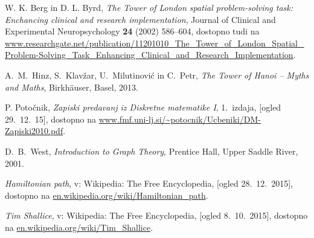 \documentclass[12pt,a4paper]{amsart}
\theoremstyle{definition} %
\theoremstyle{plain} %
\newcommand{\geslo}[2]{\noindent\textbf{#1}\hspace*{3mm}\hangindent=\parindent\hangafter=1 #2}
\begin{document}
%
%

\begin{thebibliography}{99}

W. K. Berg in D. L. Byrd, \emph{The Tower of London spatial problem-solving task: Enchancing clinical and research implementation}, Journal of Clinical and Experimental Neuropsychology \textbf{24} (2002) 586--604,
dostopno tudi na \url{www.researchgate.net/publication/11201010_The_Tower_of_London_Spatial_Problem-Solving_Task_Enhancing_Clinical_and_Research_Implementation}.

 A.\ M.\ Hinz, S.\ Klavžar, U.\ Milutinović in C.\ Petr, \emph{The Tower of Hanoi – Myths and Maths}, Birkhäuser, Basel, 2013.

 P. Potočnik, \emph{Zapiski predavanj iz Diskretne matematike I}, 1.~izdaja, [ogled 29.~12.~15], dostopno na \url{www.fmf.uni-lj.si/~potocnik/Ucbeniki/DM-Zapiski2010.pdf}.

 D.\ B.\ West, \emph{Introduction to Graph Theory}, Prentice Hall, Upper Saddle River, 2001.

 \emph{Hamiltonian path}, v: Wikipedia: The Free Encyclopedia, [ogled 28.~12.~2015], dostopno na \url{en.wikipedia.org/wiki/Hamiltonian_path}.

 \emph{Tim Shallice}, v: Wikipedia: The Free Encyclopedia, [ogled 8.~10.~2015], dostopno na \url{en.wikipedia.org/wiki/Tim_Shallice}.
\end{thebibliography}
\end{document}
